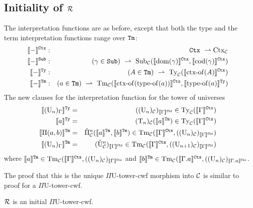 \documentclass{lmcs}
\def\UU{\mathrm{U}}
\def\Ta{\mathrm{T}}
\def\Pihat{\hat{\Pi}}
\def\UUhat{\hat{\UU}}
\newcommand{\intCtxU}[1]{\llbracket #1 \rrbracket^\RawCtx}
\newcommand{\intSubU}[1]{\llbracket #1 \rrbracket^\RawSub}
\newcommand{\intTyU}[1]{\llbracket #1 \rrbracket^\RawTy}
\newcommand{\intTmU}[1]{\llbracket #1 \rrbracket^\RawTm}
\begin{document}
\subsection{Initiality of $\mathcal{R}$}
The interpretation functions are as before, except that both the type and the term interpretation functions range over ${\tt Tm}$:
\begin{eqnarray*}
\intCtxU{-} &:& \RawCtx\ \rightharpoonup \Ctx_\C\\
\intSubU{-}&:& (\gamma \in \RawSub)\ \rightharpoonup \
\Sub_\C(\intCtxU{\domain(\gamma)}, \intCtxU{\codomain(\gamma)})\\
\intTyU{-}&:& (A \in \RawTm)\ \rightharpoonup\ \Ty_\C(\intCtxU{\ctxof(A)})\\
\intTmU{-}&:& (a \in\RawTm)\ \rightharpoonup\
\Tm_\C (\intCtxU{\ctxof(\typeof(a))}, \intTyU{\typeof(a)})
\end{eqnarray*}
The new clauses for the interpretation function for the tower of universes
\begin{eqnarray*}
\intTyU{(\UU_n)_\Gamma} &=& ((\UU_n)_\C)_{\intCtxU{\Gamma}} \in \Ty_\C(\intCtxU{\Gamma})\\
\intTyU{a} &=& (\Ta_n)_\C(\intTmU{a}) \in \Ty_\C(\intCtxU{\Gamma})\\
\intTmU{\Pi(a,b)}&=& \Pihat^n_\C(\intTmU{a},\intTmU{b}) \in \Tm_\C(\intCtxU{\Gamma},((\UU_n)_\C)_{\intCtxU{\Gamma}})\\
\intTmU{(\UU_n)_\Gamma} &=& (\UUhat^n_\C)_{\intCtxU{\Gamma}} \in \Tm_\C(\intCtxU{\Gamma},((\UU_{n+1})_\C)_{\intCtxU{\Gamma}})
\end{eqnarray*}
where 
$\intTmU{a} \in \Tm_\C(\intCtxU{\Gamma},((\UU_n)_\C)_{\intCtxU{\Gamma}}$ and 
$\intTmU{b} \in \Tm_\C(\intCtxU{\Gamma.a},((\UU_n)_\C)_{\intCtxU{\Gamma.a}}$.

The proof that this is the unique $\Pi\UU$-tower-cwf morphism into ${\mathcal C}$ is similar to proof for a $\Pi\UU$-tower-cwf. 

\begin{thm}\label{theom:initial_cwf}
  $\mathcal{R}$ is an initial $\Pi\UU$-tower-cwf.
\end{thm}



\end{document}
